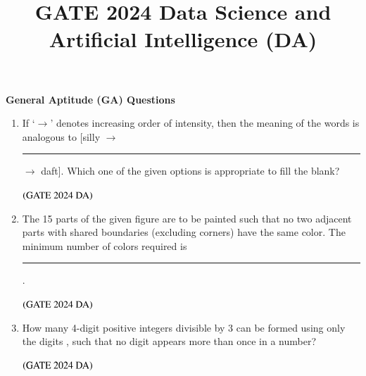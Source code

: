 \documentclass[journal,12pt,onecolumn]{IEEEtran}
\title{GATE 2024 Data Science and Artificial Intelligence (DA)}
\author{}
\theoremstyle{remark}
\begin{document}
\maketitle

\textbf{General Aptitude (GA) Questions}
\begin{enumerate}
\item If `$\rightarrow$' denotes increasing order of intensity, then the meaning of the words  is analogous to [silly $\rightarrow$ \rule{2cm}{0.5mm} $\rightarrow$ daft]. Which one of the given options is appropriate to fill the blank?
\begin{enumerate}
\end{enumerate}
\hfill $\left(\text{GATE 2024 DA}\right)$


\item The 15 parts of the given figure are to be painted such that no two adjacent parts with shared boundaries (excluding corners) have the same color. The minimum number of colors required is  \rule{2cm}{0.5mm}.
\begin{enumerate}
\end{enumerate}
\hfill $\left(\text{GATE 2024 DA}\right)$


\item How many 4-digit positive integers divisible by 3 can be formed using only the digits , such that no digit appears more than once in a number?
\begin{enumerate}
\end{enumerate}
\hfill $\left(\text{GATE 2024 DA}\right)$



\end{enumerate}
\end{document}
